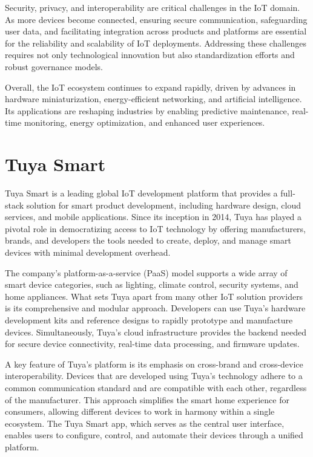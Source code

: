 Security, privacy, and interoperability are critical challenges in the IoT domain. As more devices become connected, ensuring secure communication, safeguarding user data, and facilitating integration across products and platforms are essential for the reliability and scalability of IoT deployments. Addressing these challenges requires not only technological innovation but also standardization efforts and robust governance models.

Overall, the IoT ecosystem continues to expand rapidly, driven by advances in hardware miniaturization, energy-efficient networking, and artificial intelligence. Its applications are reshaping industries by enabling predictive maintenance, real-time monitoring, energy optimization, and enhanced user experiences.

\section{Tuya Smart}

Tuya Smart is a leading global IoT development platform that provides a full-stack solution for smart product development, including hardware design, cloud services, and mobile applications. Since its inception in 2014, Tuya has played a pivotal role in democratizing access to IoT technology by offering manufacturers, brands, and developers the tools needed to create, deploy, and manage smart devices with minimal development overhead.

The company's platform-as-a-service (PaaS) model supports a wide array of smart device categories, such as lighting, climate control, security systems, and home appliances. What sets Tuya apart from many other IoT solution providers is its comprehensive and modular approach. Developers can use Tuya's hardware development kits and reference designs to rapidly prototype and manufacture devices. Simultaneously, Tuya's cloud infrastructure provides the backend needed for secure device connectivity, real-time data processing, and firmware updates.

A key feature of Tuya's platform is its emphasis on cross-brand and cross-device interoperability. Devices that are developed using Tuya's technology adhere to a common communication standard and are compatible with each other, regardless of the manufacturer. This approach simplifies the smart home experience for consumers, allowing different devices to work in harmony within a single ecosystem. The Tuya Smart app, which serves as the central user interface, enables users to configure, control, and automate their devices through a unified platform.

